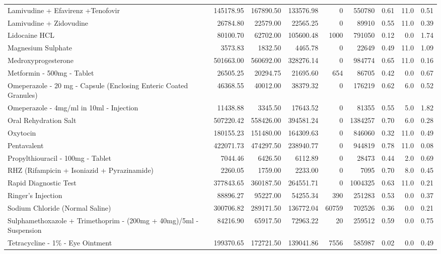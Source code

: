 \documentclass[
  authoryear,
  preprint,
  3p]{elsarticle}
\begin{document}
\begin{table}[H]
{{\begin{tabular}{lrrrrrrrr}
Lamivudine  + Efavirenz +Tenofovir & 145178.95 & 167890.50 & 133576.98 & 0 & 550780 & 0.61 & 11.0 & 0.51\\
Lamivudine + Zidovudine & 26784.80 & 22579.00 & 22565.25 & 0 & 89910 & 0.55 & 11.0 & 0.39\\
Lidocaine HCL & 80100.70 & 62702.00 & 105600.48 & 1000 & 791050 & 0.12 & 0.0 & 1.74\\
Magnesium Sulphate & 3573.83 & 1832.50 & 4465.78 & 0 & 22649 & 0.49 & 11.0 & 1.09\\
Medroxyprogesterone & 501663.00 & 560692.00 & 328276.14 & 0 & 984774 & 0.65 & 11.0 & 0.16\\
Metformin - 500mg - Tablet & 26505.25 & 20294.75 & 21695.60 & 654 & 86705 & 0.42 & 0.0 & 0.67\\
Omeperazole - 20 mg - Capsule (Enclosing Enteric Coated Granules) & 46368.55 & 40012.00 & 38379.32 & 0 & 176219 & 0.62 & 6.0 & 0.52\\
Omeperazole - 4mg/ml in 10ml - Injection & 11438.88 & 3345.50 & 17643.52 & 0 & 81355 & 0.55 & 5.0 & 1.82\\
Oral Rehydration Salt & 507220.42 & 558426.00 & 394581.24 & 0 & 1384257 & 0.70 & 6.0 & 0.28\\
Oxytocin & 180155.23 & 151480.00 & 164309.63 & 0 & 846060 & 0.32 & 11.0 & 0.49\\
Pentavalent & 422071.73 & 474297.50 & 238940.77 & 0 & 944819 & 0.78 & 11.0 & 0.08\\
Propylthiouracil - 100mg - Tablet & 7044.46 & 6426.50 & 6112.89 & 0 & 28473 & 0.44 & 2.0 & 0.69\\
RHZ (Rifampicin + Isoniazid + Pyrazinamide) & 2260.05 & 1759.00 & 2233.00 & 0 & 7095 & 0.70 & 8.0 & 0.45\\
Rapid Diagnostic Test & 377843.65 & 360187.50 & 264551.71 & 0 & 1004325 & 0.63 & 11.0 & 0.21\\
Ringer's Injection & 88896.27 & 95227.00 & 54255.34 & 390 & 251283 & 0.53 & 0.0 & 0.37\\
Sodium Chloride (Normal Saline) & 300706.82 & 289171.50 & 136772.04 & 60759 & 702526 & 0.36 & 0.0 & 0.21\\
Sulphamethoxazole + Trimethoprim - (200mg + 40mg)/5ml - Suspension & 84216.90 & 65917.50 & 72963.22 & 20 & 259512 & 0.59 & 0.0 & 0.75\\
Tetracycline - 1\% - Eye Ointment & 199370.65 & 172721.50 & 139041.86 & 7556 & 585987 & 0.02 & 0.0 & 0.49\\
\bottomrule
\end{tabular}}

}

\end{table}%
\end{document}
